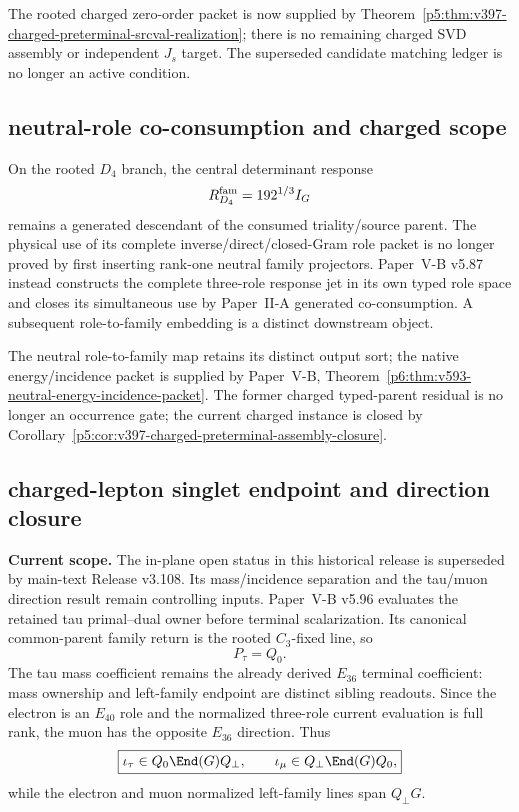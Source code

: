 \documentclass[12pt,a4paper]{article}
\begin{document}
The rooted charged zero-order packet is now supplied by
Theorem~\ref{p5:thm:v397-charged-preterminal-srcval-realization};
there is no remaining charged SVD assembly or independent $J_s$ target.
The superseded candidate matching ledger is no longer an active condition.


\subsection{neutral-role co-consumption and charged scope}
\label{p5:sec:v394-coconsumption-fermion-frontier}

\begin{corollary}
\label{p5:cor:v394-neutral-role-handoff}
On the rooted $D_4$ branch, the central determinant response
\[
 R_{D_4}^{\rm fam}=192^{1/3}I_G
\]
remains a generated descendant of the consumed triality/source parent.  The
physical use of its complete inverse/direct/closed-Gram role packet is no
longer proved by first inserting rank-one neutral family projectors.  Paper~V-B
v5.87 instead constructs the complete three-role response jet in its own typed
role space and closes its simultaneous use by Paper~II-A generated
co-consumption.  A subsequent role-to-family embedding is a distinct
downstream object.
\end{corollary}


The neutral role-to-family map retains its distinct output sort; the native
energy/incidence packet is supplied by Paper~V-B,
Theorem~\ref{p6:thm:v593-neutral-energy-incidence-packet}.
The former charged typed-parent residual is no longer an occurrence gate; the current charged
instance is closed by Corollary~\ref{p5:cor:v397-charged-preterminal-assembly-closure}.



\subsection{charged-lepton singlet endpoint and direction closure}
\label{p5:sec:v3107-charged-lepton-direction-closure}
\noindent\textbf{Current scope.} The in-plane open status in this historical release is superseded by main-text Release v3.108.  Its mass/incidence separation and the tau/muon direction result remain controlling inputs.
Paper~V-B v5.96 evaluates the retained tau primal--dual owner before terminal
scalarization.  Its canonical common-parent family return is the rooted
$C_3$-fixed line, so
\[
 \boxed{P_\tau=Q_0.}
\]
The tau mass coefficient remains the already derived $E_{36}$ terminal
coefficient: mass ownership and left-family endpoint are distinct sibling
readouts.  Since the electron is an $E_{40}$ role and the normalized
three-role current evaluation is full rank, the muon has the opposite
$E_{36}$ direction.  Thus
\[
 \boxed{
 \iota_\tau\in Q_0\End(G)Q_\perp,\qquad
 \iota_\mu\in Q_\perp\End(G)Q_0,}
\]
while the electron and muon normalized left-family lines span $Q_\perp G$.
\end{document}
